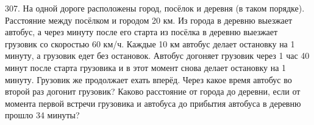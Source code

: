 307. На одной дороге расположены город, посёлок и деревня (в таком порядке). Расстояние между посёлком и городом 20 км. Из города в деревню выезжает автобус, а через минуту после его старта из посёлка в деревню выезжает грузовик со скоростью 60 км/ч. Каждые 10 км автобус делает остановку на 1 минуту, а грузовик едет без остановок. Автобус догоняет грузовик через 1 час 40 минут после старта грузовика и в этот момент снова делает остановку на 1 минуту. Грузовик же продолжает ехать вперёд. Через какое время автобус во второй раз догонит грузовик? Каково расстояние от города до деревни, если от момента первой встречи грузовика и автобуса до прибытия автобуса в деревню прошло 34 минуты?\\

